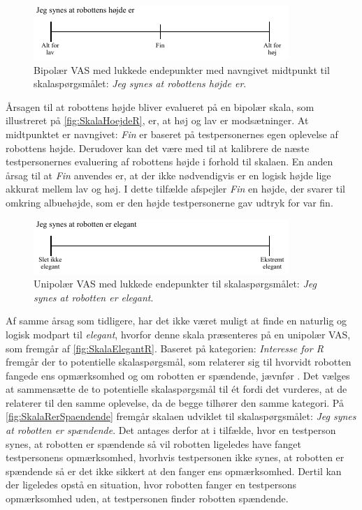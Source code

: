 %
\begin{figure}[H]
\centering
\includegraphics[width =\textwidth]{Figure/UdvalgteSkalaer/HoejdeR} 
\caption{Bipolær VAS med lukkede endepunkter med navngivet midtpunkt til skalaspørgsmålet: \textit{Jeg synes at robottens højde er}.}
\label{fig:SkalaHoejdeR}
\end{figure}
\noindent
%
Årsagen til at robottens højde bliver evalueret på en bipolær skala, som illustreret på \autoref{fig:SkalaHoejdeR}, er, at høj og lav er modsætninger. At midtpunktet er navngivet: \textit{Fin} er baseret på testpersonernes egen oplevelse af robottens højde. Derudover kan det være med til at kalibrere de næste testpersonernes evaluering af robottens højde i forhold til skalaen. En anden årsag til at \textit{Fin} anvendes er, at der ikke nødvendigvis er en logisk højde lige akkurat mellem lav og høj. I dette tilfælde afspejler \textit{Fin} en højde, der svarer til omkring albuehøjde, som er den højde testpersonerne gav udtryk for var fin. 
%
\begin{figure}[H]
\centering
\includegraphics[width =\textwidth]{Figure/UdvalgteSkalaer/ElegantR} 
\caption{Unipolær VAS med lukkede endepunkter til skalaspørgsmålet: \textit{Jeg synes at robotten er elegant}.}
\label{fig:SkalaElegantR}
\end{figure}
\noindent
%
Af samme årsag som tidligere, har det ikke været muligt at finde en naturlig og logisk modpart til \textit{elegant}, hvorfor denne skala præsenteres på en unipolær VAS, som fremgår af \autoref{fig:SkalaElegantR}.\blankline
%
Baseret på kategorien: \textit{Interesse for R} fremgår der to potentielle skalaspørgsmål, som relaterer sig til hvorvidt robotten fangede ens opmærksomhed og om robotten er spændende, jævnfør . Det vælges at sammensætte de to potentielle skalaspørgsmål til ét fordi det vurderes, at de relaterer til den samme oplevelse, da de begge tilhører den samme kategori. På \autoref{fig:SkalaRerSpaendende} fremgår skalaen udviklet til skalaspørgsmålet: \textit{Jeg synes at robotten er spændende}. Det antages derfor at i tilfælde, hvor en testperson synes, at robotten er spændende så vil robotten ligeledes have fanget testpersonens opmærksomhed, hvorhvis testpersonen ikke synes, at robotten er spændende så er det ikke sikkert at den fanger ens opmærksomhed. Dertil kan der ligeledes opstå en situation, hvor robotten fanger en testpersons opmærksomhed uden, at testpersonen finder robotten spændende.
